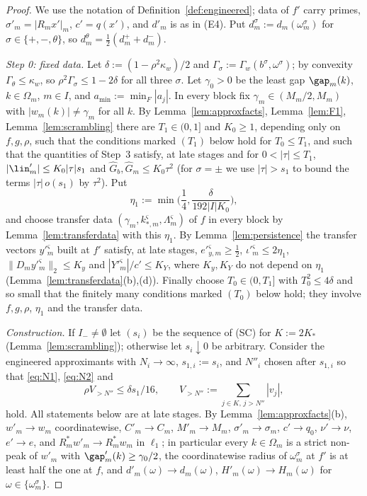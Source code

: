 \begin{proof}
We use the notation of Definition~\ref{def:engineered}; data of $f'$ carry
primes, $\sigma'_m=|R_mx'|_m$, $c'=q(x')$, and $d'_m$ is as in (E4).  Put
$d^\sigma_m:=d_m(\omega^\sigma_m)$ for $\sigma\in\{+,-,\theta\}$, so
$d^\theta_m=\frac12(d^+_m+d^-_m)$.

\emph{Step 0: fixed data.}  Let $\delta:=(1-\rho^2\kappa_w)/2$ and
$\Gamma_\sigma:=\Gamma_w(b^\sigma,\omega^\sigma)$; by convexity
$\Gamma_\theta\le\kappa_w$, so $\rho^2\Gamma_\sigma\le1-2\delta$ for all
three $\sigma$.  Let $\gamma_0>0$ be the least gap $\gap_m(k)$, $k\in
\Omega_m$, $m\in I$, and $a_{\min}:=\min_F|a_j|$.  In every block fix
$\gamma_m\in(M_m/2,M_m)$ with $|w_m(k)|\ne\gamma_m$ for all $k$.  By
Lemma~\ref{lem:approxfacts}, Lemma~\ref{lem:F1}, Lemma~\ref{lem:scrambling}
there are $T_1\in(0,1]$ and $K_0\ge1$, depending only on $f,g,\rho$, such
that the conditions marked $(T_1)$ below hold for $T_0\le T_1$, and such
that the quantities of Step~3 satisfy, at late stages and for
$0<|\tau|\le T_1$, $|\lin'_m|\le K_0|\tau|s_1$ and $\hat G_b,\hat G_m\le
K_0\tau^2$ (for $\sigma=\pm$ we use $|\tau|>s_1$ to bound the terms
$|\tau|\,o(s_1)$ by $\tau^2$).  Put
\[
 \eta_1:=\min\Big(\frac14,\frac\delta{192|I|K_0}\Big),
\]
and choose transfer data $(\gamma_m,k^\varsigma_{*,m},\Lambda^\varsigma_m)$ of
$f$ in every block by Lemma~\ref{lem:transferdata} with this $\eta_1$.  By
Lemma~\ref{lem:persistence} the transfer vectors $y'^\varsigma_m$ built at
$f'$ satisfy, at late stages, $e'^\varsigma_{y,m}\ge\frac12$,
$\iota'^\varsigma_m\le2\eta_1$, $\|D_my'^\varsigma_m\|_2\le K_y$ and
$|Y'^\varsigma_m|/c'\le K_Y$, where $K_y,K_Y$ do not depend on $\eta_1$
(Lemma~\ref{lem:transferdata}(b),(d)).  Finally choose $T_0\in(0,T_1]$ with
$T_0^2\le4\delta$ and so small that the finitely many conditions marked
$(T_0)$ below hold; they involve $f,g,\rho$, $\eta_1$ and the transfer
data.

\emph{Construction.}  If $I_-\ne\emptyset$ let $(s_i)$ be the sequence of
\textup{(SC)} for $K:=2K_*$ (Lemma~\ref{lem:scrambling}); otherwise let
$s_i\downarrow0$ be arbitrary.  Consider the engineered approximants with
$N_i\to\infty$, $s_{1,i}:=s_i$, and $N''_i$ chosen after $s_{1,i}$ so that
\eqref{eq:N1}, \eqref{eq:N2} and
\begin{equation}\label{eq:N3}
 \rho V_{>N''}\le\delta s_1/16,\qquad V_{>N''}:=\sum_{j\in K,\,j>N''}|v_j|,
\end{equation}
hold.  All statements below are at late stages.  By
Lemma~\ref{lem:approxfacts}(b), $w'_m\to w_m$ coordinatewise, $C'_m\to C_m$,
$M'_m\to M_m$, $\sigma'_m\to\sigma_m$, $c'\to q_0$, $\nu'\to\nu$, $e'\to e$,
and $R^*_mw'_m\to R_m^*w_m$ in $\ell_1$; in particular every $k\in\Omega_m$
is a strict non-peak of $w'_m$ with $\gap'_m(k)\ge\gamma_0/2$, the
coordinatewise radius of $\omega^\sigma_m$ at $f'$ is at least half the one
at $f$, and $d'_m(\omega)\to d_m(\omega)$, $H'_m(\omega)\to H_m(\omega)$ for
$\omega\in\{\omega^\sigma_m\}$.


\end{proof}
